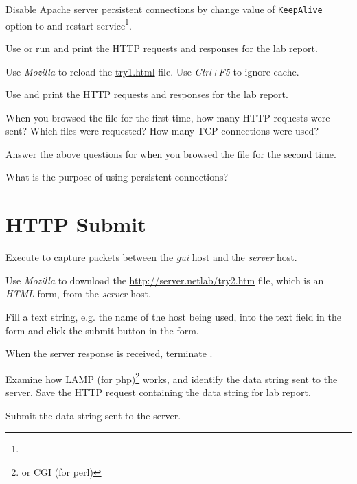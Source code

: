 \documentclass{../UTNetLab}
\begin{document}
Disable Apache server persistent connections by change value of \texttt{KeepAlive} option to  and restart  service\footnote{}.


Use  or run  and print the HTTP requests and responses for the lab report.

Use \textit{Mozilla} to reload the \url{try1.html} file.
Use \textit{Ctrl+F5} to ignore cache.

Use  and print the HTTP requests and responses for the lab report.

\begin{report}
    \item When you browsed the  file for the first time, how many HTTP requests were sent?
    Which files were requested?
    How many TCP connections were used?

    \item Answer the above questions for when you browsed the  file for the second time.

    \item What is the purpose of using persistent connections?
\end{report}

\section{HTTP Submit}
Execute  to capture packets between the \textit{gui} host and the \textit{server} host.

Use \textit{Mozilla} to download the \url{http://server.netlab/try2.htm} file, which is an \textit{HTML} form, from the \textit{server} host.

Fill a text string, e.g. the name of the host being used, into the text field in the form and click the submit button in the form.

When the server response is received, terminate .

Examine how LAMP (for php)\footnote{or CGI (for perl)} works, and identify the data string sent to the server.
Save the HTTP request containing the data string for lab report.

\begin{report}
    \item Submit the data string sent to the server.
\end{report}
\end{document}
